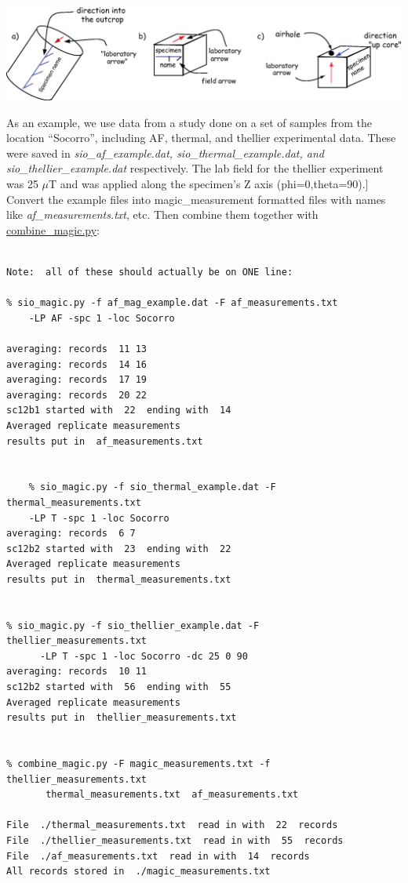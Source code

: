 \documentclass[11pt]{book}
\begin{document}
{{\includegraphics[width=20 cm]{EPSfiles/samples.eps} 




As an example, we use data from a study done on a set of samples  from the location ``Socorro'', including AF, thermal,  and thellier experimental data.  These were saved in {\it sio\_af\_example.dat, sio\_thermal\_example.dat, and sio\_thellier\_example.dat} respectively.  The lab field for the thellier experiment was 25 $\mu$T and was applied along the specimen's Z axis (phi=0,theta=90).] 
   Convert the example files  into magic\_measurement formatted files with names like
    {\it af\_measurements.txt}, etc.    Then combine them together with \href{#combine_magic}{combine\_magic.py}:   

\begin{verbatim}

Note:  all of these should actually be on ONE line:

% sio_magic.py -f af_mag_example.dat -F af_measurements.txt  
    -LP AF -spc 1 -loc Socorro

averaging: records  11 13
averaging: records  14 16
averaging: records  17 19
averaging: records  20 22
sc12b1 started with  22  ending with  14
Averaged replicate measurements
results put in  af_measurements.txt


    % sio_magic.py -f sio_thermal_example.dat -F thermal_measurements.txt  
    -LP T -spc 1 -loc Socorro
averaging: records  6 7
sc12b2 started with  23  ending with  22
Averaged replicate measurements
results put in  thermal_measurements.txt


% sio_magic.py -f sio_thellier_example.dat -F  thellier_measurements.txt  
      -LP T -spc 1 -loc Socorro -dc 25 0 90
averaging: records  10 11
sc12b2 started with  56  ending with  55
Averaged replicate measurements
results put in  thellier_measurements.txt


% combine_magic.py -F magic_measurements.txt -f  thellier_measurements.txt   
       thermal_measurements.txt  af_measurements.txt
 
File  ./thermal_measurements.txt  read in with  22  records
File  ./thellier_measurements.txt  read in with  55  records
File  ./af_measurements.txt  read in with  14  records
All records stored in  ./magic_measurements.txt


\end{verbatim}}}
\end{document}
